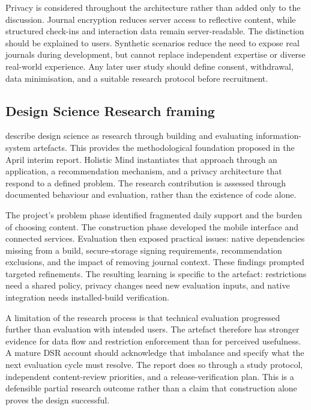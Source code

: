 Privacy is considered throughout the architecture rather than added only to the discussion. Journal encryption reduces server access to reflective content, while structured check-ins and interaction data remain server-readable. The distinction should be explained to users. Synthetic scenarios reduce the need to expose real journals during development, but cannot replace independent expertise or diverse real-world experience. Any later user study should define consent, withdrawal, data minimisation, and a suitable research protocol before recruitment.

\subsection{Design Science Research framing}

\citet{hevner2004} describe design science as research through building and evaluating information-system artefacts. This provides the methodological foundation proposed in the April interim report. Holistic Mind instantiates that approach through an application, a recommendation mechanism, and a privacy architecture that respond to a defined problem. The research contribution is assessed through documented behaviour and evaluation, rather than the existence of code alone.

The project's problem phase identified fragmented daily support and the burden of choosing content. The construction phase developed the mobile interface and connected services. Evaluation then exposed practical issues: native dependencies missing from a build, secure-storage signing requirements, recommendation exclusions, and the impact of removing journal context. These findings prompted targeted refinements. The resulting learning is specific to the artefact: restrictions need a shared policy, privacy changes need new evaluation inputs, and native integration needs installed-build verification.

A limitation of the research process is that technical evaluation progressed further than evaluation with intended users. The artefact therefore has stronger evidence for data flow and restriction enforcement than for perceived usefulness. A mature DSR account should acknowledge that imbalance and specify what the next evaluation cycle must resolve. The report does so through a study protocol, independent content-review priorities, and a release-verification plan. This is a defensible partial research outcome rather than a claim that construction alone proves the design successful.


